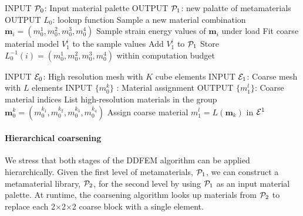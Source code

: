 	\begin{algorithmic}[1]
		\State INPUT $\mathcal{P}_0$: Input material palette
		\State OUTPUT $\mathcal{P}_1$: new palatte of metamaterials
		\State OUTPUT $L_0$: lookup function
        \Do
		\State Sample a new material combination $\mathbf{m}_i=(m_0^1,m_0^2,m_0^3,m_0^4)$
		\State Sample strain energy values of $\mathbf{m}_i$ under load
		\State Fit coarse material model $V_1^i$ to the sample values
		\State Add $V_1^i$ to $\mathcal{P}_1$
		\State Store $L_0^{-1}(i) = (m_0^1,m_0^2,m_0^3,m_0^4)$
		\doWhile within computation budget
		\EndProcedure
	\end{algorithmic}
\hrulefill
	\begin{algorithmic}[1]
		\State INPUT $\mathcal{E}_0$: High resolution mesh with $K$ cube elements
		\State INPUT $\mathcal{E}_1$: Coarse mesh with $L$ elements		
		\State INPUT $\{m_0^k\}$ : Material assignment
		\State OUTPUT $\{m_1^l\}$: Coarse material indices
		  \State List high-resolution materials in the group 
		  \State $\mathbf{m}_0^k = (m_0^{k_1},m_0^{k_2},m_0^{k_3},m_0^{k_4})$
		  \State Assign coarse material $m_1^l = L(\mathbf{m}_k)$ in $\mathcal{E}^1$
		\EndFor
		\EndProcedure
	\end{algorithmic}
\hrulefill

\paragraph{Hierarchical coarsening}
We stress that both stages of the DDFEM algorithm can be applied hierarchically. Given the first level of metamaterials, $\mathcal{P}_1$, we can construct a metamaterial library, $\mathcal{P}_2$, for the second level by using $\mathcal{P}_1$ as an input material palette. At runtime, the coarsening algorithm looks up materials from $\mathcal{P}_2$ to replace each 2$\times$2$\times$2 coarse block with a single element.
